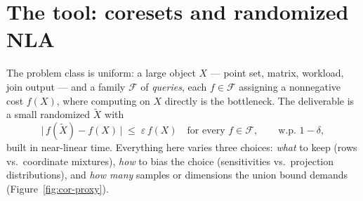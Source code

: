 \section{The tool: coresets and randomized NLA}
\label{sec:cor-tool}

The problem class is uniform: a large object $X$ --- point set, matrix,
workload, join output --- and a family $\mathcal{F}$ of \emph{queries},
each $f \in \mathcal{F}$ assigning a nonnegative cost $f(X)$, where
computing on $X$ directly is the bottleneck. The deliverable is a small
randomized $\tilde{X}$ with
\[
\bigl|\, f(\tilde{X}) - f(X) \,\bigr| \;\le\; \varepsilon\, f(X)
\quad\text{for every } f \in \mathcal{F},
\qquad\text{w.p.\ } 1-\delta,
\]
built in near-linear time. Everything here varies three choices:
\emph{what} to keep (rows vs.\ coordinate mixtures), \emph{how} to bias
the choice (sensitivities vs.\ projection distributions), and \emph{how
many} samples or dimensions the union bound demands
(Figure~\ref{fig:cor-proxy}).

\begin{widefigure}[t]
\caption{The two proxy tracks. Sampling keeps rows of the object and
reweights them by sensitivity; projection mixes coordinates through a
random matrix. Both end in the same place: solve on the small proxy,
certify every query at once with one union bound, and merge shards of
the proxy without revisiting the full object.}
\label{fig:cor-proxy}
\end{widefigure}

